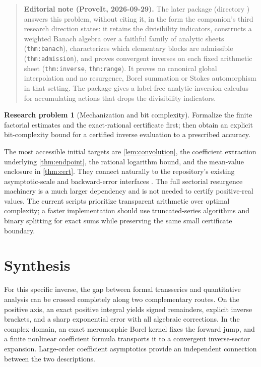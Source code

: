 \documentclass[11pt,a4paper]{article}
\theoremstyle{definition}
\newtheorem{problem}{Research problem}
\numberwithin{equation}{section}
\begin{document}
\begin{quote}\small\textbf{Editorial note (ProveIt, 2026-09-29).} The later package  (directory ) answers this problem, without citing it, in the form the companion's third research direction states: it retains the divisibility indicators, constructs a weighted Banach algebra over a faithful family of analytic sheets (\texttt{thm:banach}), characterizes which elementary blocks are admissible (\texttt{thm:admission}), and proves convergent inverses on each fixed arithmetic sheet (\texttt{thm:inverse}, \texttt{thm:range}). It proves no canonical global interpolation and no resurgence, Borel summation or Stokes automorphism in that setting. The package  gives a label-free analytic inversion calculus for accumulating actions that drops the divisibility indicators.\end{quote}

\begin{problem}[Mechanization and bit complexity]
Formalize the finite factorial estimates and the exact-rational certificate first; then obtain an explicit bit-complexity bound for a certified inverse evaluation to a prescribed accuracy.
\end{problem}
The most accessible initial targets are \cref{lem:convolution}, the coefficient extraction underlying \cref{thm:endpoint}, the rational logarithm bound, and the mean-value enclosure in \cref{thm:cert}. They connect naturally to the repository's existing asymptotic-scale and backward-error interfaces \cite{reporeadme}. The full sectorial resurgence machinery is a much larger dependency and is not needed to certify positive-real values. The current scripts prioritize transparent arithmetic over optimal complexity; a faster implementation should use truncated-series algorithms and binary splitting for exact sums while preserving the same small certificate boundary.

\section{Synthesis}
\label{sec:synthesis}

For this specific inverse, the gap between formal transseries and quantitative analysis can be crossed completely along two complementary routes. On the positive axis, an exact positive integral yields signed remainders, explicit inverse brackets, and a sharp exponential error with all algebraic corrections. In the complex domain, an exact meromorphic Borel kernel fixes the forward jump, and a finite nonlinear coefficient formula transports it to a convergent inverse-sector expansion. Large-order coefficient asymptotics provide an independent connection between the two descriptions.
\end{document}
